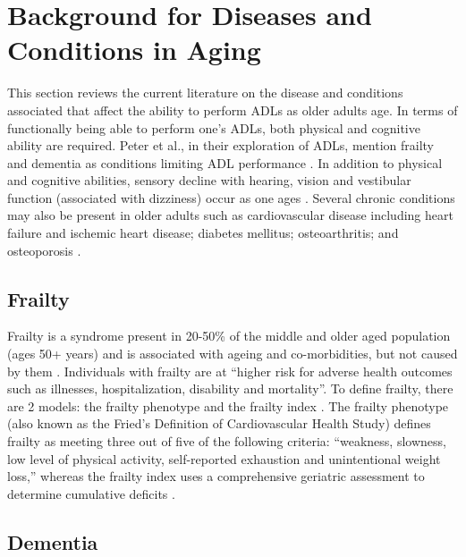 \section{Background for Diseases and Conditions in Aging}\label{sec:bg_disease}

This section reviews the current literature on the disease and conditions associated that affect the ability to perform ADLs as older adults age. In terms of functionally being able to perform one's ADLs, both physical and cognitive ability are required. Peter et al., in their exploration of ADLs, mention frailty and dementia as conditions limiting ADL performance \cite{edemekong_activities_2022}. In addition to physical and cognitive abilities, sensory decline with hearing, vision and vestibular function (associated with dizziness) occur as one ages \cite{jaul_age-related_2017}. Several chronic conditions may also be present in older adults such as cardiovascular disease including heart failure and ischemic heart disease; diabetes mellitus; osteoarthritis; and osteoporosis \cite{jaul_age-related_2017}.


\subsection{Frailty}

Frailty is a syndrome present in 20-50\% of the middle and older aged population (ages 50+ years) \cite{hewitt_prevalence_2018} and is associated with ageing and co-morbidities, but not caused by them \cite{conroy_defining_2009}. Individuals with frailty are at “higher risk for adverse health outcomes such as illnesses, hospitalization, disability and mortality”. To define frailty, there are 2 models: the frailty phenotype and the frailty index \cite{chen_frailty_2014}. The frailty phenotype (also known as the Fried’s Definition of Cardiovascular Health Study) defines frailty as meeting three out of five of the following criteria: “weakness, slowness, low level of physical activity, self-reported exhaustion and unintentional weight loss,” whereas the frailty index uses a comprehensive geriatric assessment to determine cumulative deficits \cite{chen_frailty_2014}. 

\subsection{Dementia}

